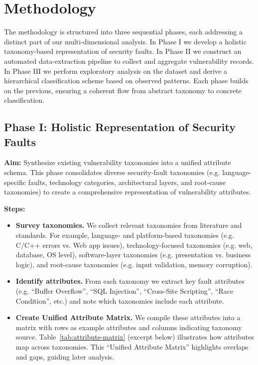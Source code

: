 \section{Methodology} The methodology is structured into three sequential phases, each addressing a distinct part of our multi-dimensional analysis. In Phase I we develop a holistic taxonomy-based representation of security faults. In Phase II we construct an automated data-extraction pipeline to collect and aggregate vulnerability records. In Phase III we perform exploratory analysis on the dataset and derive a hierarchical classification scheme based on observed patterns. Each phase builds on the previous, ensuring a coherent flow from abstract taxonomy to concrete classification. \subsection{Phase I: Holistic Representation of Security Faults} \textbf{Aim:} Synthesize existing vulnerability taxonomies into a unified attribute schema. This phase consolidates diverse security-fault taxonomies (e.g. language-specific faults, technology categories, architectural layers, and root-cause taxonomies) to create a comprehensive representation of vulnerability attributes. 
\newline

\textbf{Steps:}

\begin{itemize}
    \item \textbf{Survey taxonomies.} We collect relevant taxonomies from literature and standards. For example, language- and platform-based taxonomies (e.g. C/C++ errors vs. Web app issues), technology-focused taxonomies (e.g. web, database, OS level), software-layer taxonomies (e.g. presentation vs. business logic), and root-cause taxonomies (e.g. input validation, memory corruption).
    \item \textbf{Identify attributes.} From each taxonomy we extract key fault attributes (e.g. “Buffer Overflow”, “SQL Injection”, “Cross-Site Scripting”, “Race Condition”, etc.) and note which taxonomies include each attribute.
    \item \textbf{Create Unified Attribute Matrix.} We compile these attributes into a matrix with rows as example attributes and columns indicating taxonomy source. Table~\ref{tab:attribute-matrix} (excerpt below) illustrates how attributes map across taxonomies. This “Unified Attribute Matrix” highlights overlaps and gaps, guiding later analysis.
\end{itemize}

